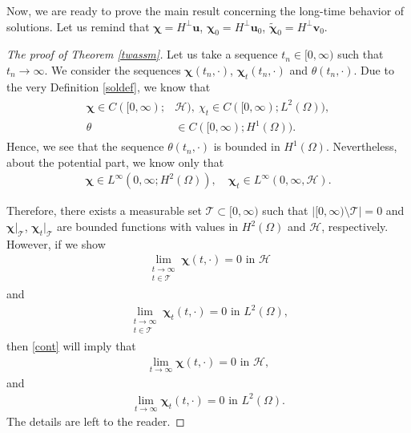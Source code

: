 \documentclass[11pt]{article}
\numberwithin{equation}{section}
\theoremstyle{plain}
\newcommand\bb[1]{\mathbf{#1}}
\newcommand{\tn}{\Omega}
\newcommand{\htwo}{H^2(\Omega)}
\renewcommand{\hom}{H^1(\tn)}
\newcommand{\ld}{L^2(\Omega)}
\newcommand{\hp}{H^{\perp}}
\newcommand{\T}{\mathcal{T}}
\newcommand{\bu}{\bb{u}}
\newcommand{\bs}[1]{\boldsymbol{#1}}
\renewcommand{\H}{\mathcal{H}}
\begin{document}
Now, we are ready to prove the main result concerning the long-time behavior of solutions. Let us remind that $\bs\chi=\hp \bu$, $\bs\chi_0=\hp \bu_0$, $\bs{\tilde\chi}_0=\hp\bb v_0$.
\begin{proof}[The proof of Theorem \ref{twassm}]
Let us take a sequence $t_n\in [0,\infty)$ such that $t_n\to\infty$. We consider the sequences $\bs\chi(t_n,\cdot)$, $\bs\chi_t(t_n,\cdot)$ and
$\theta(t_n,\cdot)$. Due to the very Definition \ref{soldef}, we know that
\begin{align}\label{cont}
\begin{split}
\bs\chi\in C([0,\infty);&\H),\ \chi_t \in C([0,\infty);\ld),\\
\theta& \in C([0,\infty);\hom).
\end{split}
\end{align}
Hence, we see that the sequence $\theta(t_n,\cdot)$ is bounded in $\hom$. Nevertheless, about the potential part, we know only that
\begin{align*}
\bs\chi\in L^{\infty}(0,\infty;\htwo),\quad \bs\chi_t\in L^{\infty}(0,\infty,\H).
\end{align*}

Therefore, there exists a measurable set $\T\subset [0,\infty)$ such that $\left|[0,\infty)\setminus\T\right|=0$ and $\bs\chi|_{\T}$, $\bs\chi_t|_{\T}$ are bounded
functions with values in $\htwo$ and $\H$, respectively.
However, if we show
\begin{align*}
\lim_{\substack{t\to\infty\\t\in\T}}\bs\chi(t,\cdot)=0\textrm{ in }\H
\end{align*}
and
\begin{align*}
\lim_{\substack{t\to\infty\\t\in\T}}\bs\chi_t(t,\cdot)=0\textrm{ in }\ld,
\end{align*}
then \eqref{cont} will imply that
\begin{align*}
\lim_{t\to\infty}\bs\chi(t,\cdot)=0\textrm{ in }\H,
\end{align*}
and
\begin{align*}
\lim_{t\to\infty}\bs\chi_t(t,\cdot)=0\textrm{ in }\ld.
\end{align*}
The details are left to the reader.


\end{proof}
\end{document}
